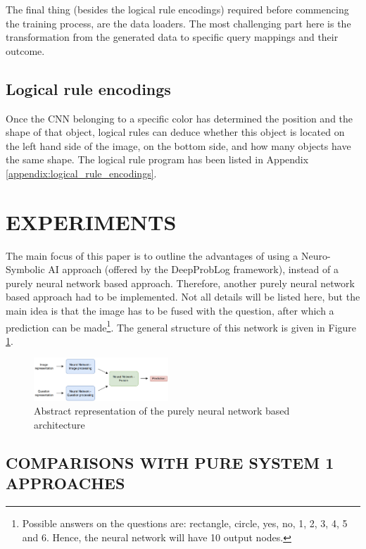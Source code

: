 \documentclass[english]{sobraep}
\begin{document}
The final thing (besides the logical rule encodings) required before commencing the training process, are the data loaders. The most challenging part here is the transformation from the generated data to specific query mappings and their outcome. 

\subsection{Logical rule encodings}
Once the CNN belonging to a specific color has determined the position and the shape of that object, logical rules can deduce whether this object is located on the left hand side of the image, on the bottom side, and how many objects have the same shape. The logical rule program has been listed in Appendix \ref{appendix:logical_rule_encodings}.

\section{EXPERIMENTS}
\label{sec:experiments}
The main focus of this paper is to outline the advantages of using a Neuro-Symbolic AI approach (offered by the DeepProbLog framework), instead of a purely neural network based approach. Therefore, another purely neural network based approach had to be implemented. Not all details will be listed here, but the main idea is that the image has to be fused with the question, after which a prediction can be made\footnote{Possible answers on the questions are: rectangle, circle, yes, no, 1, 2, 3, 4, 5 and 6. Hence, the neural network will have 10 output nodes.}. The general structure of this network is given in Figure \ref{fig:pure_nn_network}.

\begin{figure}[H]
    \begin{center}
    \includegraphics[width=0.45\textwidth]{pure_nn_architecture.png} 
    \captionsetup{justification=centering}
    \caption{Abstract representation of the purely neural network based architecture \cite{model_architecture}}
    \label{fig:pure_nn_network}
    \end{center}
\end{figure}

\subsection{COMPARISONS WITH PURE SYSTEM 1 APPROACHES}
\label{subsec:experiments_NN_vs_deepproblog}
\end{document}
